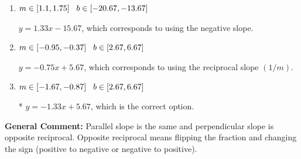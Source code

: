 \documentclass{extbook}[14pt]
\begin{document}
\begin{enumerate}
{\begin{enumerate}[label=\Alph*.]
 $y = -1.33x - 5.67$, which corresponds to using the correct slope and getting the negative $y$-intercept.
\item \( m \in [1.1, 1.75] \hspace*{3mm} b \in [-20.67, -13.67] \)

 $y = 1.33x - 15.67$, which corresponds to using the negative slope.
\item \( m \in [-0.95, -0.37] \hspace*{3mm} b \in [2.67, 6.67] \)

 $y = -0.75x + 5.67$, which corresponds to using the reciprocal slope $(1/m)$.
\item \( m \in [-1.67, -0.87] \hspace*{3mm} b \in [2.67, 6.67] \)

* $y = -1.33x + 5.67$, which is the correct option.
\end{enumerate}

\textbf{General Comment:} Parallel slope is the same and perpendicular slope is opposite reciprocal. Opposite reciprocal means flipping the fraction and changing the sign (positive to negative or negative to positive).
}
\end{enumerate}
\end{document}
